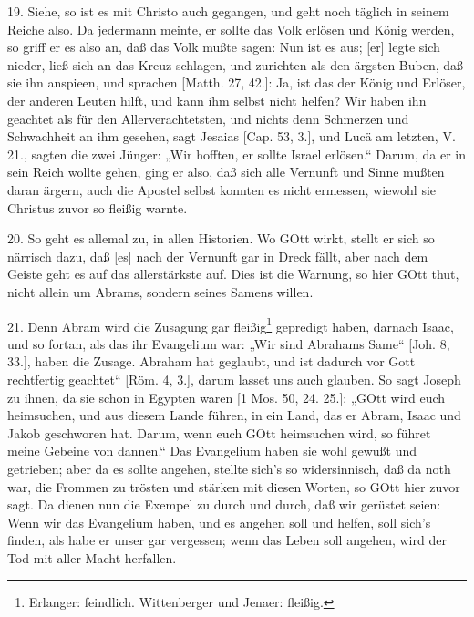 19. Siehe, so ist es mit Christo auch gegangen, und geht noch täglich in seinem Reiche also. Da jedermann meinte, er sollte das Volk erlösen und König werden, so griff er es also an, daß das Volk mußte sagen: Nun ist es aus; [er] legte sich nieder, ließ sich an das Kreuz schlagen, und zurichten als den ärgsten Buben, daß sie ihn anspieen, und sprachen [Matth. 27, 42.]: Ja, ist das der König und Erlöser, der anderen Leuten hilft, und kann ihm selbst nicht helfen? Wir haben ihn geachtet als für den Allerverachtetsten, und nichts denn Schmerzen und Schwachheit an ihm gesehen, sagt Jesaias [Cap. 53, 3.], und Lucä am letzten, V. 21., sagten die zwei Jünger: „Wir hofften, er sollte Israel erlösen.“ Darum, da er in sein Reich wollte gehen, ging er also, daß sich alle Vernunft und Sinne mußten daran ärgern, auch die Apostel selbst konnten es nicht ermessen, wiewohl sie Christus zuvor so fleißig warnte.

20. So geht es allemal zu, in allen Historien. Wo GOtt wirkt, stellt er sich so närrisch dazu, daß [es] nach der Vernunft gar in Dreck fällt, aber nach dem Geiste geht es auf das allerstärkste auf. Dies ist die Warnung, so hier GOtt thut, nicht allein um Abrams, sondern seines Samens willen.

21. Denn Abram wird die Zusagung gar
fleißig\footnote{Erlanger: feindlich. Wittenberger und Jenaer: fleißig.} gepredigt haben, darnach Isaac, und so fortan, als das ihr Evangelium war: „Wir sind Abrahams Same“ [Joh. 8, 33.], haben die Zusage. Abraham hat geglaubt, und ist dadurch vor Gott rechtfertig geachtet“ [Röm. 4, 3.], darum lasset uns auch glauben. So sagt Joseph zu ihnen, da sie schon in Egypten waren [1 Mos. 50, 24. 25.]: „GOtt wird euch heimsuchen, und aus diesem Lande führen, in ein Land, das er Abram, Isaac und Jakob geschworen hat. Darum, wenn euch GOtt heimsuchen wird, so führet meine Gebeine von dannen.“ Das Evangelium haben sie wohl gewußt und getrieben; aber da es sollte angehen, stellte sich’s so widersinnisch, daß da noth war, die Frommen zu trösten und stärken mit diesen Worten, so GOtt hier zuvor sagt. Da dienen nun die Exempel zu durch und durch, daß wir gerüstet seien: Wenn wir das Evangelium haben, und es angehen soll und helfen, soll sich’s finden, als habe er unser gar vergessen; wenn das Leben soll angehen, wird der Tod mit aller Macht herfallen.

